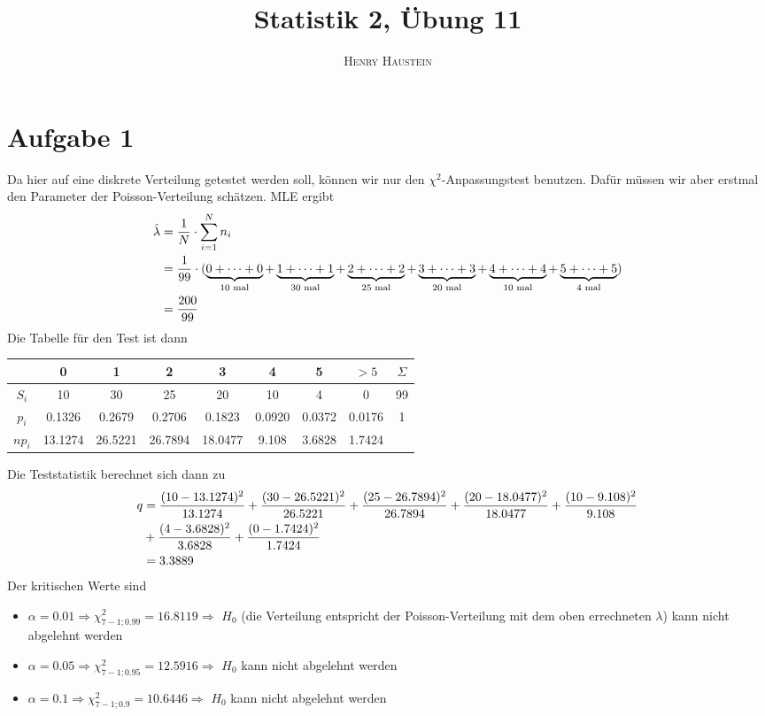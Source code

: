 \documentclass{article}
\title{\textbf{Statistik 2, Übung 11}}
\author{\textsc{Henry Haustein}}
\date{}
\begin{document}
	\maketitle
	
	\section*{Aufgabe 1}
	Da hier auf eine diskrete Verteilung getestet werden soll, können wir nur den $\chi^2$-Anpassungstest benutzen. Dafür müssen wir aber erstmal den Parameter der Poisson-Verteilung schätzen. MLE ergibt
	\begin{align}
		\hat{\lambda} &= \frac{1}{N}\cdot\sum_{i=1}^{N} n_i \notag \\
		&= \frac{1}{99} \cdot (\underbrace{0+\dots+0}_{10\text{ mal}} + \underbrace{1+\dots+1}_{30\text{ mal}} + \underbrace{2+\dots+2}_{25\text{ mal}} + \underbrace{3+\dots+3}_{20\text{ mal}} + \underbrace{4+\dots+4}_{10\text{ mal}} + \underbrace{5+\dots+5}_{4\text{ mal}}) \notag \\
		&= \frac{200}{99} \notag
	\end{align}
	Die Tabelle für den Test ist dann
	\begin{center}
		\begin{tabular}{c|ccccccc|c}
			& 0 & 1 & 2 & 3 & 4 & 5 & $> 5$ & $\Sigma$ \\
			\hline
			$S_i$ & 10 & 30 & 25 & 20 & 10 & 4 & 0 & 99 \\
			$p_i$ & 0.1326 & 0.2679 & 0.2706 & 0.1823 & 0.0920 & 0.0372 & 0.0176 & 1 \\
			$np_i$ & 13.1274 & 26.5221 & 26.7894 & 18.0477 & 9.108 & 3.6828 & 1.7424 &
		\end{tabular}
	\end{center}
	Die Teststatistik berechnet sich dann zu
	\begin{align}
		q &= \frac{(10-13.1274)^2}{13.1274} + \frac{(30-26.5221)^2}{26.5221} + \frac{(25-26.7894)^2}{26.7894} + \frac{(20-18.0477)^2}{18.0477} + \frac{(10-9.108)^2}{9.108} \notag \\
		&+ \frac{(4-3.6828)^2}{3.6828} + \frac{(0-1.7424)^2}{1.7424} \notag \\
		&= 3.3889 \notag
	\end{align}
	Der kritischen Werte sind
	\begin{itemize}
		\item $\alpha=0.01 \Rightarrow \chi^2_{7-1;0.99} = 16.8119 \Rightarrow$ $H_0$ (die Verteilung entspricht der Poisson-Verteilung mit dem oben errechneten $\lambda$) kann nicht abgelehnt werden
		\item $\alpha=0.05 \Rightarrow \chi^2_{7-1;0.95} = 12.5916 \Rightarrow$ $H_0$ kann nicht abgelehnt werden
		\item $\alpha=0.1 \Rightarrow \chi^2_{7-1;0.9} = 10.6446 \Rightarrow$ $H_0$ kann nicht abgelehnt werden
	\end{itemize}
	
\end{document}
